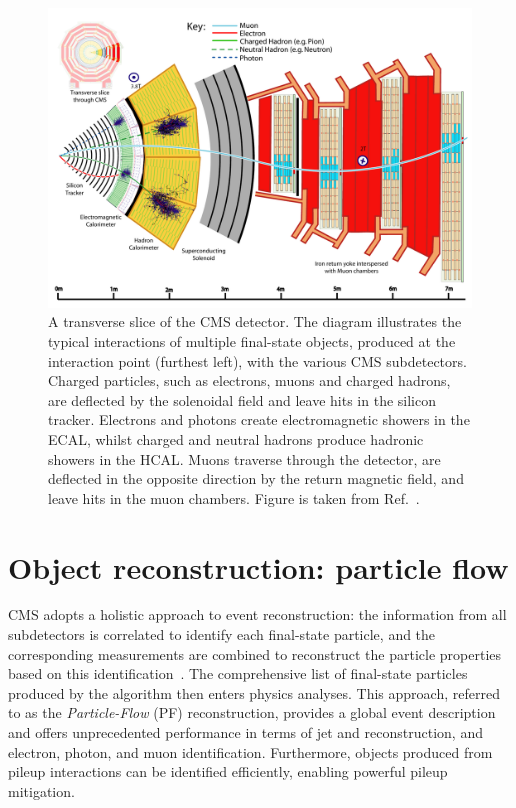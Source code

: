 \begin{figure}[htb!]
  \centering
  \includegraphics[width=1\textwidth]{Figures/cms/CMS-PRF-14-001_Figure_001.pdf}
  \caption[Particle interactions in the CMS detector]
  {
    A transverse slice of the CMS detector. The diagram illustrates the typical interactions of multiple final-state objects, produced at the interaction point (furthest left), with the various CMS subdetectors. Charged particles, such as electrons, muons and charged hadrons, are deflected by the solenoidal field and leave hits in the silicon tracker. Electrons and photons create electromagnetic showers in the ECAL, whilst charged and neutral hadrons produce hadronic showers in the HCAL. Muons traverse through the detector, are deflected in the opposite direction by the return magnetic field, and leave hits in the muon chambers. Figure is taken from Ref.~\cite{Sirunyan:2017ulk}.
  }
  \label{fig:cms_interactions}
\end{figure}

\section{Object reconstruction: particle flow}\label{sec:particle_flow}
CMS adopts a holistic approach to event reconstruction: the information from all subdetectors is correlated to identify each final-state particle, and the corresponding measurements are combined to reconstruct the particle properties based on this identification~\cite{Sirunyan:2017ulk}. The comprehensive list of final-state particles produced by the algorithm then enters physics analyses. This approach, referred to as the \textit{Particle-Flow} (PF) reconstruction, provides a global event description and offers unprecedented performance in terms of jet and \met reconstruction, and electron, photon, and muon identification. Furthermore, objects produced from pileup interactions can be identified efficiently, enabling powerful pileup mitigation.

